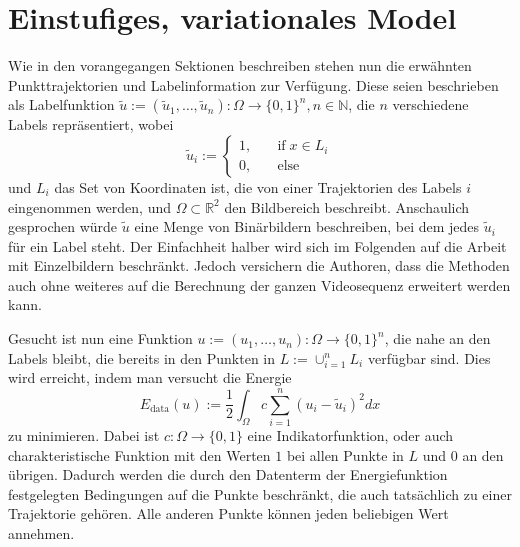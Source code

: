 \section{Einstufiges, variationales Model}

Wie in den vorangegangen Sektionen beschreiben stehen nun die erwähnten Punkttrajektorien und Labelinformation zur Verfügung. Diese seien
beschrieben als Labelfunktion $\tilde u := (\tilde u_1,\dotsc,\tilde u_n): \Omega \rightarrow  \{ 0,1 \}^n, n \in \mathbb{N}$, die $n$ verschiedene
Labels repräsentiert, wobei
\begin{equation}
  \tilde u_i := \left\{
    \begin{split}
      1, & \quad \mathrm{if}\; x\in L_i \\
      0, & \quad \mathrm{else }
    \end{split} \right.
\end{equation}
und $L_i$ das Set von Koordinaten ist, die von einer Trajektorien des Labels $i$ eingenommen werden, und $\Omega \subset \mathbb{R}^2$ den
Bildbereich beschreibt. Anschaulich gesprochen würde $\tilde u$ eine Menge von Binärbildern beschreiben, bei dem jedes $\tilde u_i$ für ein Label steht.
Der Einfachheit halber wird sich im Folgenden auf die Arbeit mit Einzelbildern beschränkt. Jedoch versichern die
Authoren, dass die Methoden auch ohne weiteres auf die Berechnung der ganzen Videosequenz erweitert werden kann.

Gesucht ist nun eine Funktion $u := (u_1,\dotsc,u_n): \Omega \rightarrow  \{ 0,1 \}^n$, die nahe an den Labels bleibt, die bereits in den Punkten in
$L := \cup_{i=1}^n L_i$ verfügbar sind. Dies wird erreicht, indem man versucht die Energie
\begin{equation}
  E_{\mathrm{data}}(u) := \frac{1}{2} \int_\Omega c \sum \limits_{i=1}^n (u_i - \tilde u_i)^2 dx
\label{eq:data1}
\end{equation}
zu minimieren. Dabei ist $c:\Omega \rightarrow \{0,1\}$ eine Indikatorfunktion, oder auch charakteristische Funktion mit den Werten $1$ bei allen
Punkte in $L$ und $0$ an den übrigen. Dadurch werden die durch den Datenterm der Energiefunktion festgelegten Bedingungen auf die Punkte beschränkt,
die auch tatsächlich zu einer Trajektorie gehören. Alle anderen Punkte können jeden beliebigen Wert annehmen.

